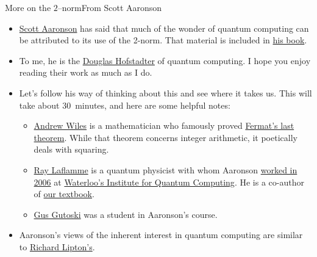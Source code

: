 \begin{frame}{More on the $2$--norm}{From Scott Aaronson}

\begin{itemize}
\item 
\href{https://scottaaronson.com/}{Scott Aaronson} has said that much of the wonder of quantum computing can be attributed to its use of the 2-norm.  That material is included in \href{https://www.amazon.com/Quantum-Computing-since-Democritus-Aaronson/dp/0521199565}{his book}.  

\item To me, he is the \href{https://en.wikipedia.org/wiki/Douglas_Hofstadter}{Douglas Hofstadter} of quantum computing.  I hope you enjoy reading their work as much as I do.
\item 
Let's follow his way of thinking about this  and see where it takes us.  This will take \alert{about 30~minutes}, and here are some helpful notes:
\begin{itemize}
    \item \href{https://en.wikipedia.org/wiki/Andrew_Wiles}{Andrew Wiles} is a mathematician who famously proved \href{https://en.wikipedia.org/wiki/Fermat\%27s_Last_Theorem}{Fermat's last theorem}. While that theorem concerns integer arithmetic, it poetically deals with squaring.
    \item \href{https://en.wikipedia.org/wiki/Raymond_Laflamme}{Ray Laflamme} is a quantum physicist with whom Aaronson \href{https://news.ycombinator.com/item?id=23621425}{worked in 2006} at \href{https://uwaterloo.ca/institute-for-quantum-computing/}{Waterloo's Institute for Quantum Computing}. He is a co-author of \href{https://www.amazon.com/Introduction-Quantum-Computing-Phillip-Kaye/dp/019857049X}{our textbook}.
    \item \href{https://www.linkedin.com/in/ggutoski/}{Gus Gutoski} was a student in Aaronson's course.
\end{itemize}
\item Aaronson's views of the inherent interest in quantum computing are similar to \href{https://mitpress.mit.edu/contributors/richard-j-lipton}{Richard Lipton's}.
\end{itemize}

\end{frame}
